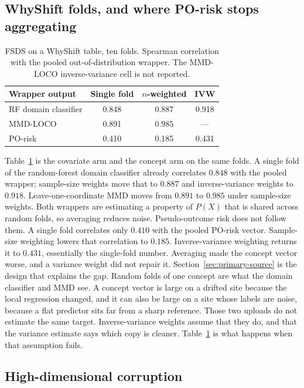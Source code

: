 \subsection{WhyShift folds, and where PO-risk stops aggregating}
\label{sec:whyshift-folds}

\begin{table}[t]
\centering
\caption{FSDS on a WhyShift table, ten folds.
Spearman correlation with the pooled out-of-distribution wrapper.
The MMD-LOCO inverse-variance cell is not reported.}
\label{tab:pol-ood}
\begin{tabular}{lccc}
\toprule
Wrapper output & Single fold & $n$-weighted & IVW \\
\midrule
RF domain classifier & 0.848 & 0.887 & 0.918 \\
MMD-LOCO & 0.891 & 0.985 & --- \\
PO-risk & 0.410 & 0.185 & 0.431 \\
\bottomrule
\end{tabular}
\end{table}

Table~\ref{tab:pol-ood} is the covariate arm and the concept arm on the
same folds.
A single fold of the random-forest domain classifier already correlates
$0.848$ with the pooled wrapper; sample-size weights move that to $0.887$
and inverse-variance weights to $0.918$.
Leave-one-coordinate MMD moves from $0.891$ to $0.985$ under sample-size
weights.
Both wrappers are estimating a property of $P(X)$ that is shared across
random folds, so averaging reduces noise.
Pseudo-outcome risk does not follow them.
A single fold correlates only $0.410$ with the pooled PO-risk vector.
Sample-size weighting lowers that correlation to $0.185$.
Inverse-variance weighting returns it to $0.431$, essentially the
single-fold number.
Averaging made the concept vector worse, and a variance weight did not
repair it.
Section~\ref{sec:primary-source} is the design that explains the gap.
Random folds of one concept are what the domain classifier and MMD see.
A concept vector is large on a drifted site because the local regression
changed, and it can also be large on a site whose labels are noise,
because a flat predictor sits far from a sharp reference.
Those two uploads do not estimate the same target.
Inverse-variance weights assume that they do, and that the variance
estimate says which copy is cleaner.
Table~\ref{tab:pol-ood} is what happens when that assumption fails.

\subsection{High-dimensional corruption}
\label{sec:hidim}

